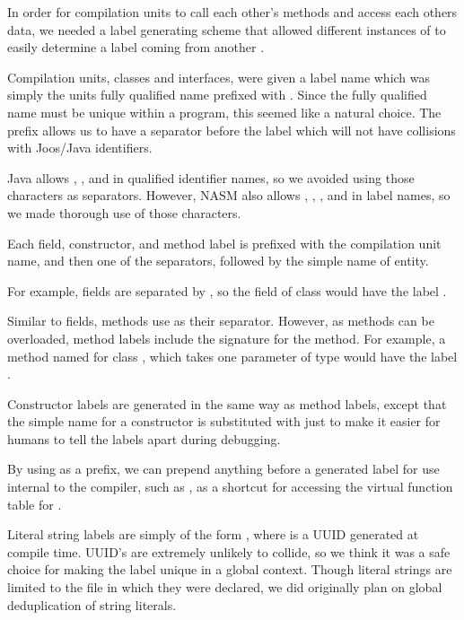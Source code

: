 \documentclass[pdftex,11pt,a4paper]{article}
\begin{document}
In order for compilation units to call each other's methods and access
each others data, we needed a label generating scheme that allowed
different instances of  to easily determine a label
coming from another .

Compilation units, classes and interfaces, were given a label name
which was simply the units fully qualified name prefixed with
. Since the fully qualified name must be unique within a
program, this seemed like a natural choice. The  prefix allows
us to have a separator before the label which will not have collisions
with Joos/Java identifiers.

Java allows \ttt{\$}, \ttt{\_}, and  in qualified identifier
names, so we avoided using those characters as separators. However,
NASM also allows \ttt{\#}, , \ttt{~}, and  in label
names, so we made thorough use of those characters.

Each field, constructor, and method label is prefixed with the
compilation unit name, and then one of the separators, followed by the
simple name of entity.

For example, fields are separated by , so the  field
of  class would have the label
.

Similar to fields, methods use \ttt{~} as their separator. However, as
methods can be overloaded, method labels include the signature for the
method. For example, a method named  for class
, which takes one parameter of type
 would have the label
.

Constructor labels are generated in the same way as method labels,
except that the simple name for a constructor is substituted with
 just to make it easier for humans to tell the labels apart
during debugging.

By using  as a prefix, we can prepend anything before a
generated label for use internal to the compiler, such as
, as a shortcut for accessing the
virtual function table for .

Literal string labels are simply of the form , where
 is a UUID generated at compile time. UUID's are extremely
unlikely to collide, so we think it was a safe choice for making the
label unique in a global context. Though literal strings are limited
to the file in which they were declared, we did originally plan on
global deduplication of string literals.
\end{document}
